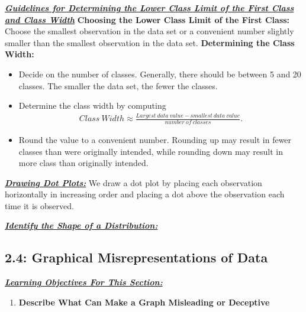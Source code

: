 \documentclass{report}
\begin{document}
         \begin{mdframed}
             \textbf{\textit{\underline{Guidelines for Determining the Lower Class Limit of the First Class and Class Width}}}
             \bigbreak \noindent 
             \textbf{Choosing the Lower Class Limit of the First Class:}
             \bigbreak \noindent 
             Choose the smallest observation in the data set or a convenient number slightly smaller than the smallest observation in the data set.
             \bigbreak \noindent 
             \textbf{Determining the Class Width:}
             \begin{itemize}
                 \item Decide on the number of classes. Generally, there should be between 5 and 20  classes. The smaller the data set, the fewer the classes.
                 \item Determine the class width by computing
                     \begin{align*}
                         Class\ Width \approx \frac{Largest\ data\ value - smallest\ data\ value}{number\ of\ classes}
                     .\end{align*}
                \item Round the value to a convenient number. Rounding up may result in fewer classes than were originally intended, while rounding down may result in more class than originally intended.
             \end{itemize}
         \end{mdframed}

         \bigbreak \noindent \bigbreak \noindent 
         \textbf{\textit{\underline{Drawing Dot Plots:}}}
         \bigbreak \noindent 
         We draw a dot plot by placing each observation horizontally in increasing order and placing a dot above the observation each time it is observed.

         \bigbreak \noindent \bigbreak \noindent 
         \textbf{\textit{\underline{Identify the Shape of a Distribution:}}}
        \begin{figure}[ht]
            \centering
            \label{fig:sr}
        \end{figure}

        \pagebreak \bigbreak \noindent
        \subsection{2.4: Graphical Misrepresentations of Data}
        \bigbreak \noindent 
        \textbf{\textit{\underline{Learning Objectives For This Section:}}}
        \begin{enumerate}
            \item \textbf{Describe What Can Make a Graph Misleading or Deceptive}
        \end{enumerate}
\end{document}

